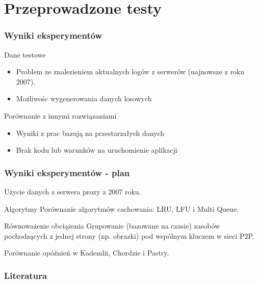 \documentclass{beamer}
\begin{document}
\section{Przeprowadzone testy}
\begin{frame}
\frametitle{Wyniki eksperymentów}

\begin{block}{Dane testowe}
\begin{itemize}
  \item Problem ze znalezieniem aktualnych logów z serwerów (najnowsze z roku 2007).
  \item Możliwośc wygenerowania danych losowych 
\end{itemize}
\end{block}

\begin{block}{Porównanie z innymi rozwiązaniami}
\begin{itemize}
  \item Wyniki z prac bazują na przestarzałych danych
  \item Brak kodu lub warunków na uruchomienie aplikacji
\end{itemize}
\end{block}
\end{frame}

\begin{frame}
\frametitle{Wyniki eksperymentów - plan}
\begin{block}{}
Użycie danych z serwera proxy z 2007 roku.
\end{block}

\begin{block}{Algorytmy}
Porównanie algorytmów cachowania: LRU, LFU i Multi Queue.
\end{block}

\begin{block}{Równoważenie obciążenia}
Grupowanie (bazowane na czasie) zasobów pochodzących z jednej strony (np. obrazki) pod wspólnym kluczem w sieci P2P.
\end{block}

\begin{block}{}
Porównanie opóźnień w Kademlii, Chordzie i Pastry.
\end{block}
\end{frame}


\begin{frame}[allowframebreaks]
\frametitle{Literatura}


\end{frame}
\end{document}
